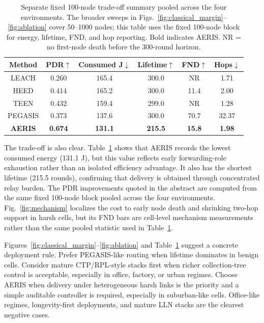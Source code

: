 \documentclass[conference]{IEEEtran}
\begin{document}
\begin{table}[t]
\caption{Separate fixed 100-node trade-off summary pooled across the four environments. The broader sweeps in Figs.~\ref{fig:classical_margin}--\ref{fig:ablation} cover 50--1000 nodes; this table uses the fixed 100-node block for energy, lifetime, FND, and hop reporting. Bold indicates AERIS. NR = no first-node death before the 300-round horizon.}
\label{tbl:pooled_summary}
\centering
\scriptsize
\setlength{\tabcolsep}{2pt}
\begin{tabular*}{\columnwidth}{@{\extracolsep{\fill}}cccccc@{}}
\toprule
Method & PDR$\uparrow$ & Consumed J$\downarrow$ & Lifetime$\uparrow$ & FND$\uparrow$ & Hops$\downarrow$ \\
\midrule
LEACH & 0.260 & 165.4 & 300.0 & NR & 1.71 \\
HEED & 0.414 & 165.2 & 300.0 & 11.4 & 2.00 \\
TEEN & 0.432 & 159.4 & 299.0 & NR & 1.28 \\
PEGASIS & 0.373 & 137.6 & 300.0 & 70.7 & 32.37 \\
\midrule
\textbf{AERIS} & \textbf{0.674} & \textbf{131.1} & \textbf{215.5} & \textbf{15.8} & \textbf{1.98} \\
\bottomrule
\end{tabular*}
\end{table}

The trade-off is also clear. Table~\ref{tbl:pooled_summary} shows that AERIS records the lowest consumed energy (131.1 J), but this value reflects early forwarding-role exhaustion rather than an isolated efficiency advantage. It also has the shortest lifetime (215.5 rounds), confirming that delivery is obtained through concentrated relay burden. The PDR improvements quoted in the abstract are computed from the same fixed 100-node block pooled across the four environments. Fig.~\ref{fig:mechanism} localizes the cost to early node death and shrinking two-hop support in harsh cells, but its FND bars are cell-level mechanism measurements rather than the same pooled statistic used in Table~\ref{tbl:pooled_summary}.

Figures~\ref{fig:classical_margin}--\ref{fig:ablation} and Table~\ref{tbl:pooled_summary} suggest a concrete deployment rule. Prefer PEGASIS-like routing when lifetime dominates in benign cells. Consider mature CTP/RPL-style stacks first when richer collection-tree control is acceptable, especially in office, factory, or urban regimes. Choose AERIS when delivery under heterogeneous harsh links is the priority and a simple auditable controller is required, especially in suburban-like cells. Office-like regimes, longevity-first deployments, and mature LLN stacks are the clearest negative cases.
\end{document}
